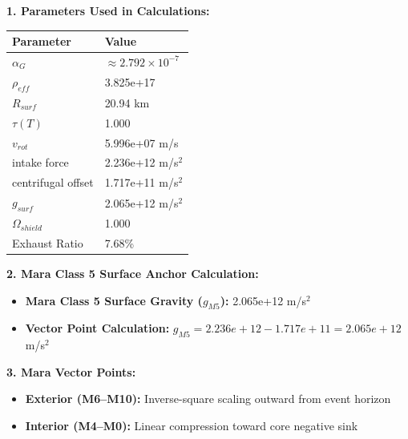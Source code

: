 \documentclass[11pt, a4paper]{article}
\begin{document}
\vspace{0.5em}
\noindent \textbf{1. Parameters Used in Calculations:}
\begin{center}
  \begin{tabular}{|l|l|}
    \hline
    \textbf{Parameter} & \textbf{Value} \\ \hline
    $\alpha_G$ & $\approx 2.792 \times 10^{-7}$ \\ \hline
    $\rho_{eff}$ & 3.825e+17 \\ \hline
    $R_{surf}$ & 20.94 km \\ \hline
    $\tau(T)$ & 1.000 \\ \hline
    $v_{rot}$ & 5.996e+07 m/s \\ \hline
    intake force & 2.236e+12 m/s$^2$ \\ \hline
    centrifugal offset & 1.717e+11 m/s$^2$ \\ \hline
    $g_{surf}$ & 2.065e+12 m/s$^2$ \\ \hline
    $\Omega_{shield}$ & 1.000 \\ \hline
    Exhaust Ratio & 7.68\% \\ \hline
  \end{tabular}
\end{center}

\vspace{0.5em}
\noindent \textbf{2. Mara Class 5 Surface Anchor Calculation:}
\begin{itemize}
  \item \textbf{Mara Class 5 Surface Gravity ($g_{M5}$):} 2.065e+12 m/s$^2$
  \item \textbf{Vector Point Calculation:} $g_{M5} = 2.236e+12 - 1.717e+11 = 2.065e+12$ m/s$^2$
\end{itemize}

\vspace{0.5em}
\noindent \textbf{3. Mara Vector Points:}
\begin{itemize}
  \item \textbf{Exterior (M6--M10):} Inverse-square scaling outward from event horizon
  \item \textbf{Interior (M4--M0):} Linear compression toward core negative sink
\end{itemize}
\end{document}
